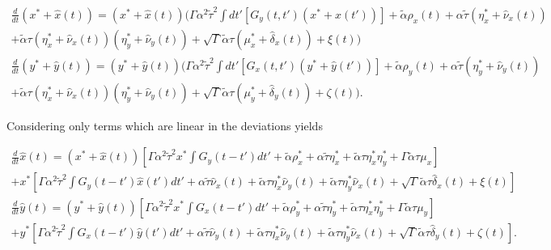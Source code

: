 \documentclass[.../main.tex]{subfiles}
\begin{document}
\begin{equation}
	\begin{split}
		\frac{d}{dt} (x^* + \hat{x}(t)) = (x^* + \hat{x}(t))(\Gamma \alpha^2 \tilde{\tau}^2 \int dt'
		[G_y(t, t')(x^* + \hat{x}(t'))] + \tilde{\alpha} \rho_x(t) + \alpha \tilde{\tau} (\eta_x^* + \hat{\nu}_x
		(t)) \\ + \tilde{\alpha} \tau (\eta_x^* + \hat{\nu}_x(t)) (\eta_y^* + \hat{\nu}_y(t)) + \sqrt{\Gamma} \tilde{\alpha} \tau (\mu_x^* + \hat{\delta}_x(t)) + \xi(t)) \\
		\frac{d}{dt} (y^* + \hat{y}(t)) = (y^* + \hat{y}(t))(\Gamma \alpha^2 \tilde{\tau}^2 \int dt'
		[G_x(t, t')(y^* + \hat{y}(t'))] + \tilde{\alpha} \rho_y(t) + \alpha \tilde{\tau} (\eta_y^* + \hat{\nu}_y
		(t)) \\ + \tilde{\alpha} \tau (\eta_x^* + \hat{\nu}_x(t)) (\eta_y^* + \hat{\nu}_y(t))
		 + \sqrt{\Gamma} \tilde{\alpha} \tau (\mu_y^* + \hat{\delta}_y(t)) + \zeta(t)).
	\end{split}
\end{equation}

Considering only terms which are linear in the deviations yields

\begin{equation} 
	\label{eqn::Linearisation}
	\begin{split}
	\frac{d}{dt} \hat{x}(t) = (x^* + \hat{x}(t))\left[ \Gamma \alpha^2 \tilde{\tau}^2 x^* \int G_y(t - t') dt' + \tilde{\alpha} \rho_x^* + \alpha \tilde{\tau} \eta_x^* + \tilde{\alpha} \tau \eta_x^* \eta_y^* + \Gamma \tilde{\alpha} \tau \mu_x \right] \\
	+ x^* \left[ \Gamma \alpha^2 \tilde{\tau}^2 \int G_y(t - t') \hat{x}(t') dt' + \alpha \tilde{\tau} \hat{\nu}_x(t) + \tilde{\alpha} \tau \eta_x^* \hat{\nu}_y(t) + \tilde{\alpha} \tau \eta_y^* \hat{\nu}_x(t) + \sqrt{\Gamma} \tilde{\alpha} \tau \hat{\delta}_x(t) + \xi(t) \right]\\
	\frac{d}{dt} \hat{y}(t) = (y^* + \hat{y}(t))\left[ \Gamma \alpha^2 \tilde{\tau}^2 x^* \int G_x(t - t') dt' + \tilde{\alpha} \rho_y^* + \alpha \tilde{\tau} \eta_y^* + \tilde{\alpha} \tau \eta_x^* \eta_y^* + \Gamma \tilde{\alpha} \tau \mu_y \right] \\
	+ y^* \left[ \Gamma \alpha^2 \tilde{\tau}^2 \int G_x(t - t') \hat{y}(t') dt' + \alpha \tilde{\tau} \hat{\nu}_y(t) + \tilde{\alpha} \tau \eta_x^* \hat{\nu}_y(t) + \tilde{\alpha} \tau \eta_y^* \hat{\nu}_x(t) + \sqrt{\Gamma} \tilde{\alpha} \tau \hat{\delta}_y(t) + \zeta(t) \right].\\
	\end{split}
\end{equation}
\end{document}
